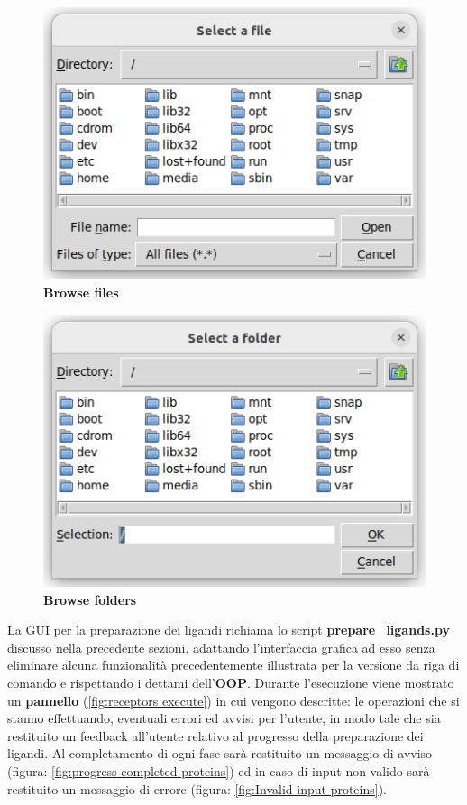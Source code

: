 \begin{figure}[H]
    \centering
    \includegraphics{immagini/browseFilesReceptors.png}
    \caption{\textbf{Browse files}}
    \label{fig:browse files receptors}
\end{figure}

\begin{figure}[H]
    \centering
    \includegraphics{immagini/browseFoldersReceptors.png}
    \caption{\textbf{Browse folders}}
    \label{fig:browse folders receptors}
\end{figure}

La GUI per la preparazione dei ligandi richiama lo script \textbf{prepare\_ligands.py} discusso nella precedente sezioni, adattando l'interfaccia grafica ad esso senza eliminare alcuna funzionalità precedentemente illustrata per la versione da riga di comando e rispettando i dettami dell'\textbf{OOP}.\newline
Durante l'esecuzione viene mostrato un \textbf{pannello} (\ref{fig:receptors execute}) in cui vengono descritte: le operazioni che si stanno effettuando, eventuali errori ed avvisi per l'utente, in modo tale che sia restituito un feedback all'utente relativo al progresso della preparazione dei ligandi. Al completamento di ogni fase sarà restituito un messaggio di avviso (figura: \ref{fig:progress completed proteins}) ed in caso di input non valido sarà restituito un messaggio di errore (figura: \ref{fig:Invalid input proteins}).

